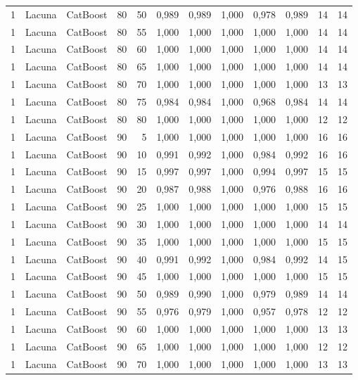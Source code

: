 \begin{longtable}{@{}rllrrrrrrrrr@{}}
1 & Lacuna & CatBoost & 80 & 50 & 0,989 & 0,989 & 1,000 & 0,978 & 0,989 & 14 & 14 \\
1 & Lacuna & CatBoost & 80 & 55 & 1,000 & 1,000 & 1,000 & 1,000 & 1,000 & 14 & 14 \\
1 & Lacuna & CatBoost & 80 & 60 & 1,000 & 1,000 & 1,000 & 1,000 & 1,000 & 14 & 14 \\
1 & Lacuna & CatBoost & 80 & 65 & 1,000 & 1,000 & 1,000 & 1,000 & 1,000 & 14 & 14 \\
1 & Lacuna & CatBoost & 80 & 70 & 1,000 & 1,000 & 1,000 & 1,000 & 1,000 & 13 & 13 \\
1 & Lacuna & CatBoost & 80 & 75 & 0,984 & 0,984 & 1,000 & 0,968 & 0,984 & 14 & 14 \\
1 & Lacuna & CatBoost & 80 & 80 & 1,000 & 1,000 & 1,000 & 1,000 & 1,000 & 12 & 12 \\
1 & Lacuna & CatBoost & 90 & 5 & 1,000 & 1,000 & 1,000 & 1,000 & 1,000 & 16 & 16 \\
1 & Lacuna & CatBoost & 90 & 10 & 0,991 & 0,992 & 1,000 & 0,984 & 0,992 & 16 & 16 \\
1 & Lacuna & CatBoost & 90 & 15 & 0,997 & 0,997 & 1,000 & 0,994 & 0,997 & 15 & 15 \\
1 & Lacuna & CatBoost & 90 & 20 & 0,987 & 0,988 & 1,000 & 0,976 & 0,988 & 16 & 16 \\
1 & Lacuna & CatBoost & 90 & 25 & 1,000 & 1,000 & 1,000 & 1,000 & 1,000 & 15 & 15 \\
1 & Lacuna & CatBoost & 90 & 30 & 1,000 & 1,000 & 1,000 & 1,000 & 1,000 & 14 & 14 \\
1 & Lacuna & CatBoost & 90 & 35 & 1,000 & 1,000 & 1,000 & 1,000 & 1,000 & 15 & 15 \\
1 & Lacuna & CatBoost & 90 & 40 & 0,991 & 0,992 & 1,000 & 0,984 & 0,992 & 14 & 15 \\
1 & Lacuna & CatBoost & 90 & 45 & 1,000 & 1,000 & 1,000 & 1,000 & 1,000 & 15 & 15 \\
1 & Lacuna & CatBoost & 90 & 50 & 0,989 & 0,990 & 1,000 & 0,979 & 0,989 & 14 & 14 \\
1 & Lacuna & CatBoost & 90 & 55 & 0,976 & 0,979 & 1,000 & 0,957 & 0,978 & 12 & 12 \\
1 & Lacuna & CatBoost & 90 & 60 & 1,000 & 1,000 & 1,000 & 1,000 & 1,000 & 13 & 13 \\
1 & Lacuna & CatBoost & 90 & 65 & 1,000 & 1,000 & 1,000 & 1,000 & 1,000 & 12 & 12 \\
1 & Lacuna & CatBoost & 90 & 70 & 1,000 & 1,000 & 1,000 & 1,000 & 1,000 & 13 & 13 \\

\end{longtable}
